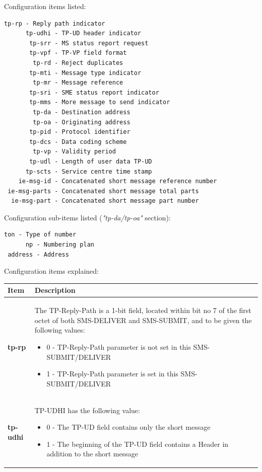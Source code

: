 \documentclass[a4paper,latin]{paper}
\begin{document}
\noindent{}Configuration items listed:
\begin{lstlisting}[style=BashInputStyle, belowskip=\baselineskip]
        tp-rp - Reply path indicator
      tp-udhi - TP-UD header indicator
       tp-srr - MS status report request
       tp-vpf - TP-VP field format      
        tp-rd - Reject duplicates
       tp-mti - Message type indicator
        tp-mr - Message reference
       tp-sri - SME status report indicator
       tp-mms - More message to send indicator
        tp-da - Destination address
        tp-oa - Originating address
       tp-pid - Protocol identifier
       tp-dcs - Data coding scheme 
        tp-vp - Validity period
       tp-udl - Length of user data TP-UD
      tp-scts - Service centre time stamp
    ie-msg-id - Concatenated short message reference number
 ie-msg-parts - Concatenated short message total parts
  ie-msg-part - Concatenated short message part number
\end{lstlisting}
\noindent{}Configuration sub-items listed (\textit{"tp-da/tp-oa"} section):
\begin{lstlisting}[style=BashInputStyle, belowskip=\baselineskip]
     ton - Type of number
      np - Numbering plan
 address - Address
\end{lstlisting}
\noindent{}Configuration items explained:\\
\begin{tabularx}{\textwidth}{ | l | X |}
	\hline
	Item	 				& Description \\
	\hline
	\textbf{tp-rp}				& The TP-Reply-Path is a 1-bit field, located within bit no 7 of the first octet of both SMS-DELIVER and SMS-SUBMIT, 
						  and to be given the following values: 
	  					  \begin{itemize}
						  	\setlength{\itemsep}{0pt}
							\setlength{\parskip}{0pt}
							\setlength{\parsep}{0pt}
							\item 0 - TP-Reply-Path parameter is not set in this SMS-SUBMIT/DELIVER
							\item 1 - TP-Reply-Path parameter is set in this SMS-SUBMIT/DELIVER
						    \end{itemize} \\ 
	\textbf{tp-udhi}			& TP-UDHI has the following value:
 	  					  \begin{itemize}
						  	\setlength{\itemsep}{0pt}
							\setlength{\parskip}{0pt}
							\setlength{\parsep}{0pt}
							\item 0 - The TP-UD field contains only the short message
							\item 1 - The beginning of the TP-UD field contains a Header in addition to the short message
						    \end{itemize} \\ 
	\hline
\end{tabularx}
\end{document}
